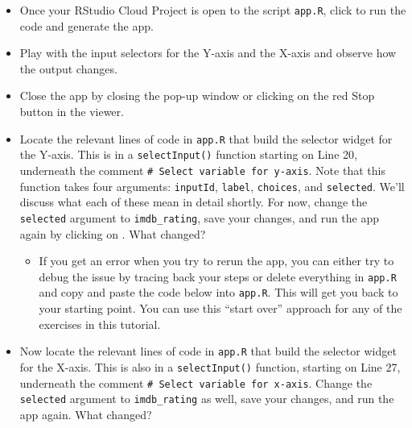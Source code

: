 \documentclass[
  letterpaper,
  DIV=11,
  numbers=noendperiod]{scrreprt}
\providecommand{\tightlist}{%
  \setlength{\itemsep}{0pt}\setlength{\parskip}{0pt}}
\begin{document}
\begin{itemize}
\tightlist
\item
  Once your RStudio Cloud Project is open to the script \texttt{app.R},
  click to run the code and generate the app.
\item
  Play with the input selectors for the Y-axis and the X-axis and
  observe how the output changes.
\item
  Close the app by closing the pop-up window or clicking on the red Stop
  button in the viewer.
\item
  Locate the relevant lines of code in \texttt{app.R} that build the
  selector widget for the Y-axis. This is in a \texttt{selectInput()}
  function starting on Line 20, underneath the comment
  \texttt{\#\ Select\ variable\ for\ y-axis}. Note that this function
  takes four arguments: \texttt{inputId}, \texttt{label},
  \texttt{choices}, and \texttt{selected}. We'll discuss what each of
  these mean in detail shortly. For now, change the \texttt{selected}
  argument to \texttt{imdb\_rating}, save your changes, and run the app
  again by clicking on . What changed?

  \begin{itemize}
  \tightlist
  \item
    If you get an error when you try to rerun the app, you can either
    try to debug the issue by tracing back your steps or delete
    everything in \texttt{app.R} and copy and paste the code below into
    \texttt{app.R}. This will get you back to your starting point. You
    can use this ``start over'' approach for any of the exercises in
    this tutorial.
  \end{itemize}
\item
  Now locate the relevant lines of code in \texttt{app.R} that build the
  selector widget for the X-axis. This is also in a
  \texttt{selectInput()} function, starting on Line 27, underneath the
  comment \texttt{\#\ Select\ variable\ for\ x-axis}. Change the
  \texttt{selected} argument to \texttt{imdb\_rating} as well, save your
  changes, and run the app again. What changed?
\end{itemize}
\end{document}
